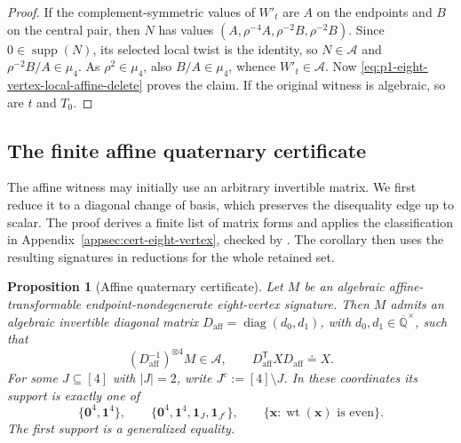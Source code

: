 \documentclass[11pt,letterpaper,onecolumn]{article}
\theoremstyle{plain}
\newtheorem{proposition}[proposition]{Proposition}
\theoremstyle{definition}
\theoremstyle{remark}
\newcommand{\AlgNums}{\overline{\mathbb Q}}
\newcommand{\cA}{\mathscr A}
\newcommand{\diag}{\operatorname{diag}}
\newcommand{\wt}{\operatorname{wt}}
\newcommand{\supp}{\operatorname{supp}}
\newcommand{\one}{\mathbf 1}
\newcommand{\zero}{\mathbf 0}
\begin{document}
\begin{proof}
If the complement-symmetric values of \(W'_t\) are \(A\) on the endpoints
and \(B\) on the central pair, then \(N\) has values
\((A,\rho^{-4}A,\rho^{-2}B,\rho^{-2}B)\).  Since \(0\in\supp(N)\), its
selected local twist is the identity, so \(N\in\cA\) and
\(\rho^{-2}B/A\in\mu_4\).  As \(\rho^2\in\mu_4\), also \(B/A\in\mu_4\),
whence \(W'_t\in\cA\).  Now
\cref{eq:p1-eight-vertex-local-affine-delete} proves the
claim.  If the original witness is algebraic, so are \(t\) and \(T_0\).
\end{proof}

\subsection{The finite affine quaternary certificate}
\label{proofsubsec:affine-certificate}

The affine witness may initially use an arbitrary invertible matrix.
We first reduce it to a diagonal change of basis, which preserves the
disequality edge up to scalar. The proof derives a finite list of matrix
forms and applies the classification in
Appendix~\ref{appsec:cert-eight-vertex}, checked by
. The corollary then uses the
resulting signatures in reductions for the whole retained set.

\begin{proposition}[Affine quaternary certificate]
\label{prop:p1-affine-eight-vertex-certificate}
Let \(M\) be an algebraic affine-transformable
endpoint-nondegenerate eight-vertex signature.  Then \(M\) admits an
algebraic invertible diagonal matrix
\(D_{\mathrm{aff}}=\diag(d_0,d_1)\), with
\(d_0,d_1\in\AlgNums^\times\), such that
\[
  (D_{\mathrm{aff}}^{-1})^{\otimes4}M\in\cA,
  \qquad D_{\mathrm{aff}}^{\mathsf T}XD_{\mathrm{aff}}\doteq X.
\]
For some \(J\subseteq[4]\) with \(|J|=2\), write
\(J^c:=[4]\setminus J\).  In these coordinates its support is exactly one
of
\[
  \{\zero^4,\one^4\},
  \qquad
  \{\zero^4,\one^4,\one_J,\one_{J^c}\},
  \qquad
  \{{\mathbf{x}}:\wt({\mathbf{x}})\text{ is even}\}.
\]
The first support is a generalized equality.
\end{proposition}
\end{document}
